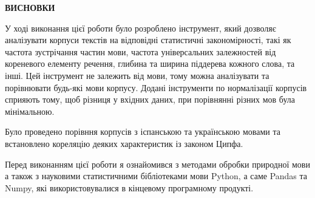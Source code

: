 {}

\pagestyle{empty}

\begin{center}
\textbf{\Large ВИСНОВКИ}
\end{center}

У ході виконання цієї роботи було розроблено інструмент, який дозволяє аналізувати
корпуси текстів на відповідні статистичні закономірності, такі як частота зустрічання
частин мови, частота універсальних залежностей від кореневого елементу речення, глибина
та ширина піддерева кожного слова, та інші.
Цей інструмент не залежить від мови, тому можна аналізувати та порівнювати будь-які мови
корпусу. Додані інструменти по нормалізації корпусів сприяють тому, щоб різниця
у вхідних даних, при порівнянні різних мов була мінімальною.

Було проведено порівння корпусів з іспанською та українською мовами та встановлено кореляцію
деяких характеристик із законом Ципфа.

Перед виконанням цієї роботи я ознайомився з методами обробки природної мови
а також з науковими статистичними бібліотеками мови Python, а саме Pandas та Numpy, які використовувалися
в кінцевому програмному продукті.
